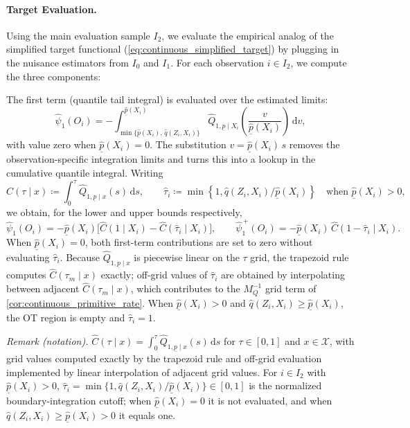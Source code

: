 \paragraph{Target Evaluation.} Using the main evaluation sample $I_2$, we evaluate the empirical analog of the simplified target functional (\ref{eq:continuous_simplified_target}) by plugging in the nuisance estimators from $I_0$ and $I_1$. For each observation $i \in I_2$, we compute the three components:

    The first term (quantile tail integral) is evaluated over the estimated limits:
    \begin{equation*}
        \hat\psi_1(O_i)=-\int_{\min\{\hat{\underline p}(X_i),\,\hat q(Z_i,X_i)\}}^{\hat{\underline p}(X_i)}
        \widehat Q_{1,\underline p\mid X_i}\!\left(\frac{v}{\hat{\underline p}(X_i)}\right)\,\mathrm dv,
    \end{equation*}
with value zero when $\hat{\underline p}(X_i)=0$. The substitution $v=\hat{\underline p}(X_i)\,s$ removes the observation-specific integration limits and turns this into a lookup in the cumulative quantile integral. Writing
    \begin{equation*}
        \widehat C(\tau\mid x)\coloneqq\int_0^\tau\widehat Q_{1,\underline p\mid x}(s)\,\mathrm ds,
        \qquad
        \hat\tau_i\coloneqq\min\!\left\{1,\hat q(Z_i,X_i)/\hat{\underline p}(X_i)\right\}
        \quad\text{when }\hat{\underline p}(X_i)>0,
    \end{equation*}
we obtain, for the lower and upper bounds respectively,
    \begin{equation*}
        \hat\psi_1(O_i)=-\hat{\underline p}(X_i)\bigl[\widehat C(1\mid X_i)-\widehat C(\hat\tau_i\mid X_i)\bigr],
        \qquad
        \hat\psi_1^{\,+}(O_i)=-\hat{\underline p}(X_i)\,\widehat C(1-\hat\tau_i\mid X_i).
    \end{equation*}
When $\hat{\underline p}(X_i)=0$, both first-term contributions are set to zero without evaluating $\hat\tau_i$. Because $\widehat Q_{1,\underline p\mid x}$ is piecewise linear on the $\tau$ grid, the trapezoid rule computes $\widehat C(\tau_m\mid x)$ exactly; off-grid values of $\hat\tau_i$ are obtained by interpolating between adjacent $\widehat C(\tau_m\mid x)$, which contributes to the $M_Q^{-1}$ grid term of \cref{cor:continuous_primitive_rate}. When $\hat{\underline p}(X_i)>0$ and $\hat q(Z_i,X_i)\ge\hat{\underline p}(X_i)$, the OT region is empty and $\hat\tau_i=1$.

\noindent\textit{Remark (notation).} $\widehat C(\tau\mid x)=\int_0^\tau\widehat Q_{1,\underline p\mid x}(s)\,\mathrm ds$ for $\tau\in[0,1]$ and $x\in\mathcal X$, with grid values computed exactly by the trapezoid rule and off-grid evaluation implemented by linear interpolation of adjacent grid values. For $i\in I_2$ with $\hat{\underline p}(X_i)>0$, $\hat\tau_i=\min\{1,\hat q(Z_i,X_i)/\hat{\underline p}(X_i)\}\in[0,1]$ is the normalized boundary-integration cutoff; when $\hat{\underline p}(X_i)=0$ it is not evaluated, and when $\hat q(Z_i,X_i)\geqslant\hat{\underline p}(X_i)>0$ it equals one.


